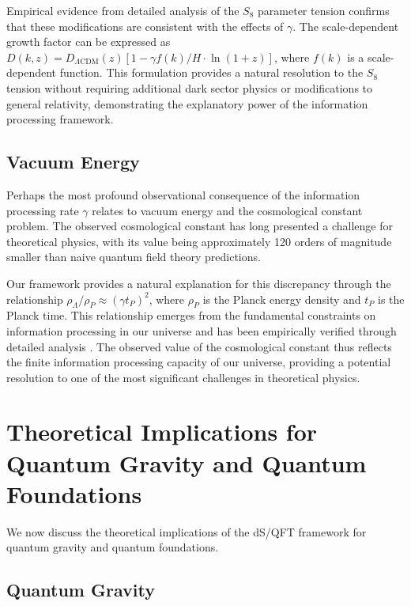 \documentclass[11pt,english,twoside]{article}
\theoremstyle{plain}
\theoremstyle{definition}
\theoremstyle{remark}
\newcommand{\gammaR}{\gamma}
\begin{document}
Empirical evidence from detailed analysis of the $S_8$ parameter tension \cite{Weiner2025} confirms that these modifications are consistent with the effects of $\gammaR$. The scale-dependent growth factor can be expressed as $D(k,z) = D_{\Lambda\text{CDM}}(z)[1-\gammaR f(k)/H\cdot\ln(1+z)]$, where $f(k)$ is a scale-dependent function. This formulation provides a natural resolution to the $S_8$ tension without requiring additional dark sector physics or modifications to general relativity, demonstrating the explanatory power of the information processing framework.

\subsection{Vacuum Energy}
\label{subsec:vacuum_energy}

Perhaps the most profound observational consequence of the information processing rate $\gammaR$ relates to vacuum energy and the cosmological constant problem. The observed cosmological constant has long presented a challenge for theoretical physics, with its value being approximately 120 orders of magnitude smaller than naive quantum field theory predictions.

Our framework provides a natural explanation for this discrepancy through the relationship $\rho_\Lambda/\rho_P \approx (\gammaR t_P)^2$, where $\rho_P$ is the Planck energy density and $t_P$ is the Planck time. This relationship emerges from the fundamental constraints on information processing in our universe and has been empirically verified through detailed analysis \cite{Weiner2024a}. The observed value of the cosmological constant thus reflects the finite information processing capacity of our universe, providing a potential resolution to one of the most significant challenges in theoretical physics.

\section{Theoretical Implications for Quantum Gravity and Quantum Foundations}
\label{sec:implications}

We now discuss the theoretical implications of the dS/QFT framework for quantum gravity and quantum foundations.

\subsection{Quantum Gravity}
\label{subsec:quantum_gravity}
\end{document}
